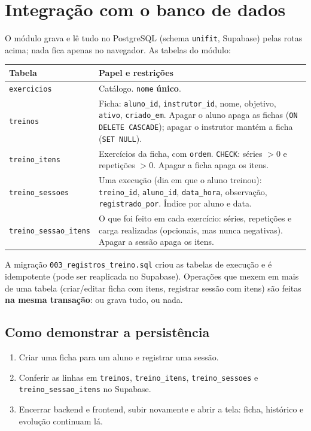 \documentclass[11pt,a4paper,final]{article}
\newcommand{\cod}[1]{\texttt{#1}}
\begin{document}
\section{Integração com o banco de dados}\label{sec:banco}

O módulo grava e lê tudo no PostgreSQL (schema \cod{unifit}, Supabase) pelas rotas acima; nada fica apenas
no navegador. As tabelas do módulo:

\begin{xltabular}{\textwidth}{l Y}
  \toprule
  \textbf{Tabela} & \textbf{Papel e restrições} \\
  \midrule
  \endhead
  \cod{exercicios}          & Catálogo. \cod{nome} \textbf{único}. \\
  \cod{treinos}             & Ficha: \cod{aluno\_id}, \cod{instrutor\_id}, nome, objetivo, \cod{ativo}, \cod{criado\_em}. Apagar o aluno apaga as fichas (\cod{ON DELETE CASCADE}); apagar o instrutor mantém a ficha (\cod{SET NULL}). \\
  \cod{treino\_itens}       & Exercícios da ficha, com \cod{ordem}. \cod{CHECK}: séries $>0$ e repetições $>0$. Apagar a ficha apaga os itens. \\
  \cod{treino\_sessoes}     & Uma execução (dia em que o aluno treinou): \cod{treino\_id}, \cod{aluno\_id}, \cod{data\_hora}, observação, \cod{registrado\_por}. Índice por aluno e data. \\
  \cod{treino\_sessao\_itens} & O que foi feito em cada exercício: séries, repetições e carga realizadas (opcionais, mas nunca negativas). Apagar a sessão apaga os itens. \\
  \bottomrule
\end{xltabular}

A migração \cod{003\_registros\_treino.sql} criou as tabelas de execução e é idempotente (pode ser reaplicada
no Supabase). Operações que mexem em mais de uma tabela (criar/editar ficha com itens, registrar sessão com
itens) são feitas \textbf{na mesma transação}: ou grava tudo, ou nada.

\subsection{Como demonstrar a persistência}

\begin{enumerate}
  \item Criar uma ficha para um aluno e registrar uma sessão.
  \item Conferir as linhas em \cod{treinos}, \cod{treino\_itens}, \cod{treino\_sessoes} e \cod{treino\_sessao\_itens} no Supabase.
  \item Encerrar backend e frontend, subir novamente e abrir a tela: ficha, histórico e evolução continuam lá.
\end{enumerate}
\end{document}
